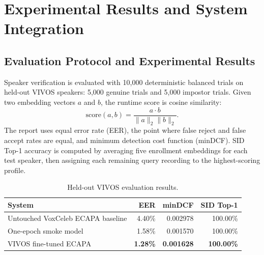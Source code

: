 \newcommand{\pendingdemo}[2]{%
\begin{figure}[H]
\centering
\fcolorbox{black!35}{pendinggray}{%
\begin{minipage}[c][4.0cm][c]{0.82\textwidth}
\centering
\textbf{Pending live demonstration evidence}\\[6pt]
\small #1\\[8pt]
\footnotesize Replace this framed placeholder with the final device screenshot before submission.
\end{minipage}}
\caption{#2}
\end{figure}}

\section{Experimental Results and System Integration}

\subsection{Evaluation Protocol and Experimental Results}
Speaker verification is evaluated with 10,000 deterministic balanced trials on held-out VIVOS speakers: 5,000 genuine trials and 5,000 impostor trials. Given two embedding vectors $a$ and $b$, the runtime score is cosine similarity:
\[
    \mathrm{score}(a,b) = \frac{a \cdot b}{\lVert a \rVert_2\lVert b \rVert_2}.
\]
The report uses equal error rate (EER), the point where false reject and false accept rates are equal, and minimum detection cost function (minDCF). SID Top-1 accuracy is computed by averaging five enrollment embeddings for each test speaker, then assigning each remaining query recording to the highest-scoring profile.

\begin{table}[H]
\centering
\begin{tabularx}{\textwidth}{Xrrr}
\toprule
\textbf{System} & \textbf{EER} & \textbf{minDCF} & \textbf{SID Top-1} \\
\midrule
Untouched VoxCeleb ECAPA baseline & 4.40\% & 0.002978 & 100.00\% \\
One-epoch smoke model & 1.58\% & 0.001570 & 100.00\% \\
VIVOS fine-tuned ECAPA & \textbf{1.28\%} & \textbf{0.001628} & \textbf{100.00\%} \\
\bottomrule
\end{tabularx}
\caption{Held-out VIVOS evaluation results.}
\label{tab:results}
\end{table}

